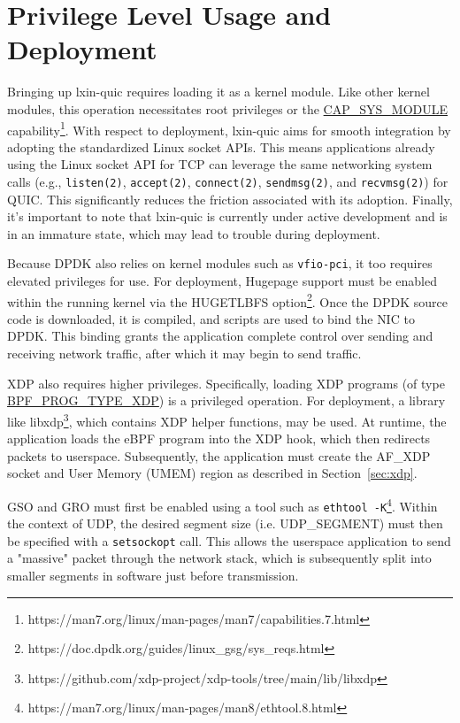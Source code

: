\section{Privilege Level Usage and Deployment}
\label{subsec:bring-up-and-privelege-level-usage}

Bringing up lxin-quic requires loading it as a kernel module. Like other kernel modules, this operation necessitates root privileges or the \url{CAP\_SYS\_MODULE} capability\footnote{https://man7.org/linux/man-pages/man7/capabilities.7.html}. With respect to deployment, lxin-quic aims for smooth integration by adopting the standardized Linux socket APIs. This means applications already using the Linux socket API for \ac{TCP} can leverage the same networking system calls (e.g., \texttt{listen(2)}, \texttt{accept(2)}, \texttt{connect(2)}, \texttt{sendmsg(2)}, and \texttt{recvmsg(2)}) for QUIC. This significantly reduces the friction associated with its adoption. Finally, it's important to note that lxin-quic is currently under active development and is in an immature state, which may lead to trouble during deployment.

Because \ac{DPDK} also relies on kernel modules such as \texttt{vfio-pci}, it too requires elevated privileges for use. For deployment, Hugepage support must be enabled within the running kernel via the HUGETLBFS option\footnote{https://doc.dpdk.org/guides/linux\_gsg/sys\_reqs.html}. Once the \ac{DPDK} source code is downloaded, it is compiled, and scripts are used to bind the \ac{NIC} to \ac{DPDK}. This binding grants the application complete control over sending and receiving network traffic, after which it may begin to send traffic.

\ac{XDP} also requires higher privileges. Specifically, loading \ac{XDP} programs (of type \url{BPF\_PROG\_TYPE\_XDP}) is a privileged operation. For deployment, a library like libxdp\footnote{https://github.com/xdp-project/xdp-tools/tree/main/lib/libxdp}, which contains \ac{XDP} helper functions, may be used. At runtime, the application loads the \ac{eBPF} program into the \ac{XDP} hook, which then redirects packets to userspace. Subsequently, the application must create the AF\_XDP socket and User Memory (UMEM) region as described in Section~\ref{sec:xdp}.

\ac{GSO} and \ac{GRO} must first be enabled using a tool such as \texttt{ethtool -K}\footnote{https://man7.org/linux/man-pages/man8/ethtool.8.html}. Within the context of \ac{UDP}, the desired segment size (i.e. UDP\_SEGMENT) must then be specified with a \texttt{setsockopt} call. This allows the userspace application to send a "massive" packet through the network stack, which is subsequently split into smaller segments in software just before transmission.
